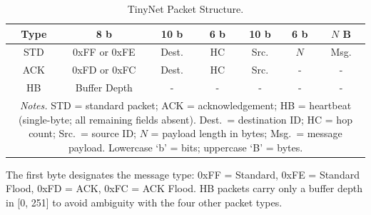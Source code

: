 \begin{table}[h]
	\centering
	\caption{TinyNet Packet Structure.}
	\label{tab:packet-structure}
	\begin{tabular}{||c|c c c c c c||}
		\hline
		Type & 8 b & 10 b & 6 b & 10 b & 6 b & $N$ B \\
		\hline\hline
		STD & 0xFF or 0xFE & Dest. & HC & Src. & $N$ & Msg. \\
		ACK & 0xFD or 0xFC & Dest. & HC & Src. & -    & -    \\
		HB  & Buffer Depth & -     & -  & -    & -    & -    \\
		\hline
		\multicolumn{7}{p{0.9\linewidth}}{\footnotesize\textit{Notes.} STD = standard packet; ACK = acknowledgement; HB = heartbeat (single-byte; all remaining fields absent). Dest.\ = destination ID; HC = hop count; Src.\ = source ID; $N$ = payload length in bytes; Msg.\ = message payload. Lowercase `b' = bits; uppercase `B' = bytes.}
	\end{tabular}
\end{table}
The first byte designates the message type: 0xFF = Standard, 0xFE = Standard Flood, 0xFD = ACK, 0xFC = ACK Flood. HB packets carry only a buffer depth in [0, 251] to avoid ambiguity with the four other packet types.

